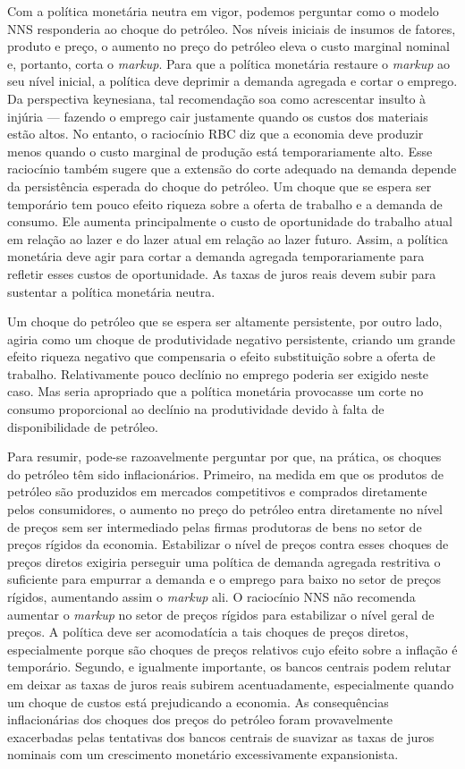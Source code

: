 \documentclass[12pt]{article}
\begin{document}
Com a política monetária neutra em vigor, podemos perguntar como o modelo NNS responderia ao choque do petróleo. Nos níveis iniciais de insumos de fatores, produto e preço, o aumento no preço do petróleo eleva o custo marginal nominal e, portanto, corta o \textit{markup}. Para que a política monetária restaure o \textit{markup} ao seu nível inicial, a política deve deprimir a demanda agregada e cortar o emprego. Da perspectiva keynesiana, tal recomendação soa como acrescentar insulto à injúria — fazendo o emprego cair justamente quando os custos dos materiais estão altos. No entanto, o raciocínio RBC diz que a economia deve produzir menos quando o custo marginal de produção está temporariamente alto. Esse raciocínio também sugere que a extensão do corte adequado na demanda depende da persistência esperada do choque do petróleo. Um choque que se espera ser temporário tem pouco efeito riqueza sobre a oferta de trabalho e a demanda de consumo. Ele aumenta principalmente o custo de oportunidade do trabalho atual em relação ao lazer e do lazer atual em relação ao lazer futuro. Assim, a política monetária deve agir para cortar a demanda agregada temporariamente para refletir esses custos de oportunidade. As taxas de juros reais devem subir para sustentar a política monetária neutra.

Um choque do petróleo que se espera ser altamente persistente, por outro lado, agiria como um choque de produtividade negativo persistente, criando um grande efeito riqueza negativo que compensaria o efeito substituição sobre a oferta de trabalho. Relativamente pouco declínio no emprego poderia ser exigido neste caso. Mas seria apropriado que a política monetária provocasse um corte no consumo proporcional ao declínio na produtividade devido à falta de disponibilidade de petróleo.

Para resumir, pode-se razoavelmente perguntar por que, na prática, os choques do petróleo têm sido inflacionários. Primeiro, na medida em que os produtos de petróleo são produzidos em mercados competitivos e comprados diretamente pelos consumidores, o aumento no preço do petróleo entra diretamente no nível de preços sem ser intermediado pelas firmas produtoras de bens no setor de preços rígidos da economia. Estabilizar o nível de preços contra esses choques de preços diretos exigiria perseguir uma política de demanda agregada restritiva o suficiente para empurrar a demanda e o emprego para baixo no setor de preços rígidos, aumentando assim o \textit{markup} ali. O raciocínio NNS não recomenda aumentar o \textit{markup} no setor de preços rígidos para estabilizar o nível geral de preços. A política deve ser acomodatícia a tais choques de preços diretos, especialmente porque são choques de preços relativos cujo efeito sobre a inflação é temporário. Segundo, e igualmente importante, os bancos centrais podem relutar em deixar as taxas de juros reais subirem acentuadamente, especialmente quando um choque de custos está prejudicando a economia. As consequências inflacionárias dos choques dos preços do petróleo foram provavelmente exacerbadas pelas tentativas dos bancos centrais de suavizar as taxas de juros nominais com um crescimento monetário excessivamente expansionista.
\end{document}
